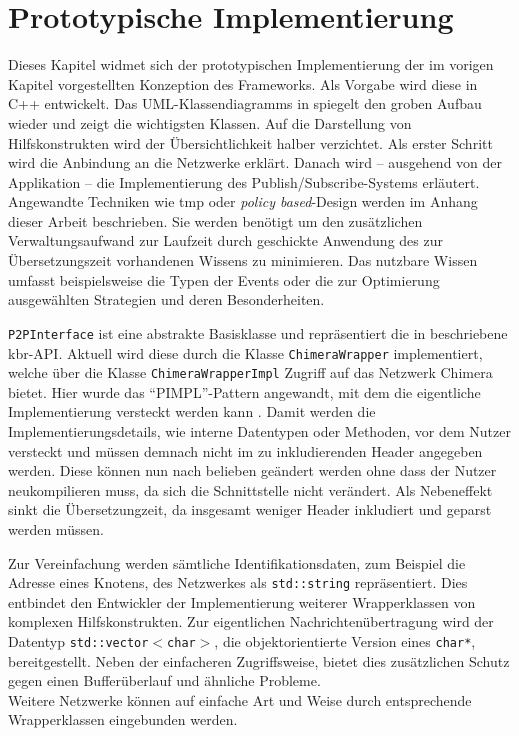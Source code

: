 \chapter{Prototypische Implementierung}
\label{chap:impl}
Dieses Kapitel widmet sich der prototypischen Implementierung der im vorigen Kapitel vorgestellten Konzeption des Frameworks. Als Vorgabe wird diese in  C++ entwickelt. Das UML-Klassendiagramms in  spiegelt den groben Aufbau wieder und zeigt die wichtigsten Klassen. Auf die Darstellung von Hilfskonstrukten wird der Übersichtlichkeit halber verzichtet. Als erster Schritt wird die Anbindung an die Netzwerke erklärt. Danach wird -- ausgehend von der Applikation -- die Implementierung des Publish/Subscribe-Systems erläutert. Angewandte Techniken wie \ac{tmp} oder \emph{policy based}-Design werden im Anhang dieser Arbeit beschrieben. Sie werden benötigt um den zusätzlichen Verwaltungsaufwand zur Laufzeit durch geschickte Anwendung des zur Übersetzungszeit vorhandenen Wissens zu minimieren. Das nutzbare Wissen umfasst beispielsweise die Typen der Events oder die zur Optimierung ausgewählten Strategien und deren Besonderheiten.

\texttt{P2PInterface} ist eine abstrakte Basisklasse und repräsentiert die in \cite{Dabek2003Towards} beschriebene \ac{kbr}-API. Aktuell wird diese durch die Klasse \texttt{ChimeraWrapper} implementiert, welche über die Klasse \texttt{ChimeraWrapperImpl} Zugriff auf das Netzwerk Chimera bietet. Hier wurde das \enquote{PIMPL}-Pattern angewandt, mit dem die eigentliche Implementierung versteckt werden kann \cite{Alexandrescu2001Modern}. Damit werden die Implementierungsdetails, wie interne Datentypen oder Methoden, vor dem Nutzer versteckt und müssen demnach nicht im zu inkludierenden Header angegeben werden. Diese können nun nach belieben geändert werden ohne dass der Nutzer neukompilieren muss, da sich die Schnittstelle nicht verändert. Als Nebeneffekt sinkt die Übersetzungzeit, da insgesamt weniger Header inkludiert und geparst werden müssen.

Zur Vereinfachung werden sämtliche Identifikationsdaten, zum Beispiel die Adresse eines Knotens, des Netzwerkes als \texttt{std::string} repräsentiert. Dies entbindet den Entwickler der Implementierung weiterer Wrapperklassen von komplexen Hilfskonstrukten. Zur eigentlichen Nachrichtenübertragung wird der Datentyp \texttt{std::vector$<$char$>$}, die objektorientierte Version eines \texttt{char*}, bereitgestellt. Neben der einfacheren Zugriffsweise, bietet dies zusätzlichen Schutz gegen einen Bufferüberlauf und ähnliche Probleme.\\
Weitere Netzwerke können auf einfache Art und Weise durch entsprechende Wrapperklassen eingebunden werden.

